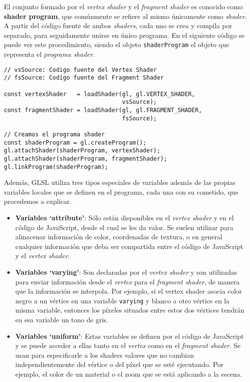 El conjunto formado por el \textit{vertex shader} y el \textit{fragment shader} es conocido como \textbf{shader program}, que comúnmente se refiere al mismo únicamente como \textit{shader}. A partir del código fuente de ambos \textit{shaders}, cada uno se crea y compila por separado, para seguidamente unirse en único programa. En el siguiente código se puede ver este procedimiento, siendo el objeto \verb|shaderProgram| el objeto que representa el \textit{programa shader}.

\begin{lstlisting}
// vsSource: Codigo fuente del Vertex Shader
// fsSource: Codigo fuente del Fragment Shader

const vertexShader   = loadShader(gl, gl.VERTEX_SHADER, 
                                  vsSource);
const fragmentShader = loadShader(gl, gl.FRAGMENT_SHADER, 
                                  fsSource);
  
// Creamos el programa shader
const shaderProgram = gl.createProgram();
gl.attachShader(shaderProgram, vertexShader);
gl.attachShader(shaderProgram, fragmentShader);
gl.linkProgram(shaderProgram);
\end{lstlisting}

Además, GLSL utiliza tres tipos especiales de variables además de las propias variables locales que se definen en el programa, cada una con su cometido, que procedemos a explicar.

\begin{itemize}
    \item \textbf{Variables `attribute'}: Sólo están disponibles en el \textit{vertex shader} y en el código de JavaScript, desde el cual se les da valor. Se suelen utilizar para almacenar información de color, coordenadas de textura, o en general cualquier información que deba ser compartida entre el código de JavaScript y el \textit{vertex shader}.
    \item \textbf{Variables `varying'}: Son declaradas por el \textit{vertex shader} y son utilizadas para enviar información desde el \textit{vertex} para el \textit{fragment shader}, de manera que la información se interpola. Por ejemplo, si el vertex shader asocia color negro a un vértice en una variable \verb|varying| y blanco a otro vértice en la misma variable, entonces los píxeles situados entre estos dos vértices tendrán en esa variable un tono de gris.
    \item \textbf{Variables `uniform'}: Estas variables se definen por el código de JavaScript y se puede acceder a ellas tanto en el \textit{vertex} como en el \textit{fragment shader}. Se usan para especificarle a los shaders valores que no cambian independientemente del vértice o del píxel que se esté ejecutando. Por ejemplo, el color de un material o el zoom que se está aplicando a la escena.
\end{itemize}

